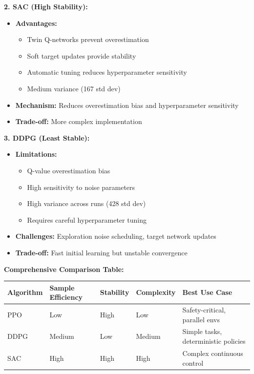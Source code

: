 \documentclass[12pt]{article}
\begin{document}
{{{\textbf{2. SAC (High Stability):}
\begin{itemize}
    \item \textbf{Advantages:}
    \begin{itemize}
        \item Twin Q-networks prevent overestimation
        \item Soft target updates provide stability
        \item Automatic tuning reduces hyperparameter sensitivity
        \item Medium variance (167 std dev)
    \end{itemize}
    \item \textbf{Mechanism:} Reduces overestimation bias and hyperparameter sensitivity
    \item \textbf{Trade-off:} More complex implementation
\end{itemize}

\textbf{3. DDPG (Least Stable):}
\begin{itemize}
    \item \textbf{Limitations:}
    \begin{itemize}
        \item Q-value overestimation bias
        \item High sensitivity to noise parameters
        \item High variance across runs (428 std dev)
        \item Requires careful hyperparameter tuning
    \end{itemize}
    \item \textbf{Challenges:} Exploration noise scheduling, target network updates
    \item \textbf{Trade-off:} Fast initial learning but unstable convergence
\end{itemize}

\textbf{Comprehensive Comparison Table:}

\begin{table}[h]
\centering
\begin{tabular}{|l|l|l|l|l|}
\hline
\textbf{Algorithm} & \textbf{Sample Efficiency} & \textbf{Stability} & \textbf{Complexity} & \textbf{Best Use Case} \\
\hline
PPO & Low & High & Low & Safety-critical, parallel envs \\
DDPG & Medium & Low & Medium & Simple tasks, deterministic policies \\
SAC & High & High & High & Complex continuous control \\
\hline
\end{tabular}
\end{table}

}}}
\end{document}
